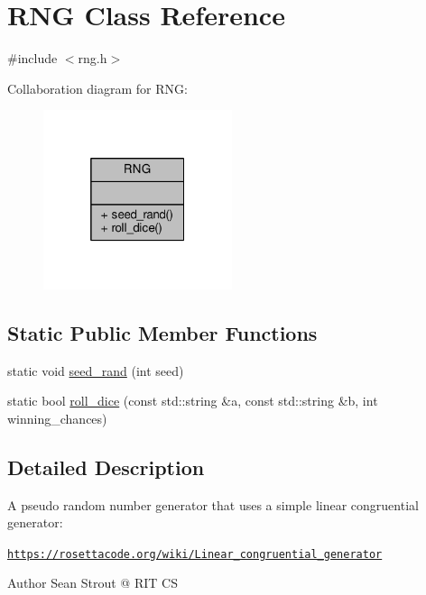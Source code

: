 \hypertarget{classRNG}{}\section{R\+NG Class Reference}
\label{classRNG}


{\ttfamily \#include $<$rng.\+h$>$}



Collaboration diagram for R\+NG\+:
\nopagebreak
\begin{figure}[H]
\begin{center}
\leavevmode
\includegraphics[width=157pt]{classRNG__coll__graph}
\end{center}
\end{figure}
\subsection*{Static Public Member Functions}
\begin{DoxyCompactItemize}
\item 
static void \hyperlink{classRNG_ab860f171afa8f937eccba29a8575f55a}{seed\+\_\+rand} (int seed)
\item 
static bool \hyperlink{classRNG_ad3340707ef6f70eeb2923572c2839b02}{roll\+\_\+dice} (const std\+::string \&a, const std\+::string \&b, int winning\+\_\+chances)
\end{DoxyCompactItemize}


\subsection{Detailed Description}
A pseudo random number generator that uses a simple linear congruential generator\+:

\href{https://rosettacode.org/wiki/Linear_congruential_generator}{\tt https\+://rosettacode.\+org/wiki/\+Linear\+\_\+congruential\+\_\+generator}

\begin{DoxyAuthor}{Author}
Sean Strout @ R\+IT CS 
\end{DoxyAuthor}


